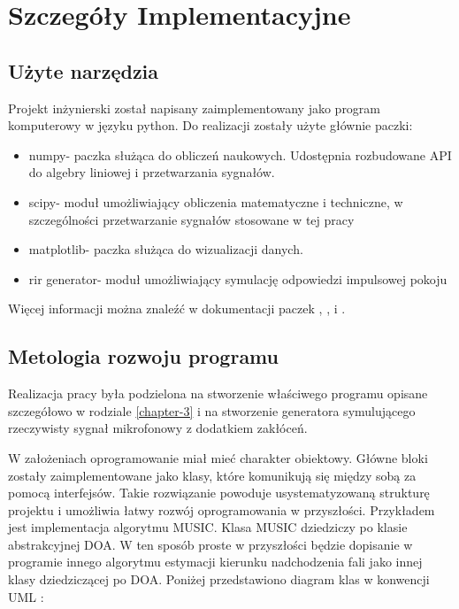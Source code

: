 \chapter{Szczegóły Implementacyjne}
\label{chapter-4}

\section{Użyte narzędzia}

\noindent Projekt inżynierski został napisany zaimplementowany jako program komputerowy w języku python. Do realizacji zostały użyte głównie paczki:

\begin{itemize}
    \item numpy- paczka służąca do obliczeń naukowych. Udostępnia rozbudowane API do algebry liniowej i przetwarzania sygnałów.
    \item scipy- moduł umożliwiający obliczenia matematyczne i techniczne, w szczególności przetwarzanie sygnałów stosowane w tej pracy
    \item matplotlib- paczka służąca do wizualizacji danych.
    \item rir generator- moduł umożliwiający symulację odpowiedzi impulsowej pokoju
\end{itemize}

\noindent Więcej informacji można znaleźć w dokumentacji paczek \cite{numpy}, \cite{matplotlib}, \cite{rir} i \cite{scipy}.

\section{Metologia rozwoju programu}

\noindent Realizacja pracy była podzielona na stworzenie właściwego programu opisane szczegółowo w rodziale \ref{chapter-3} i na stworzenie generatora symulującego rzeczywisty sygnał mikrofonowy z dodatkiem zakłóceń.


W założeniach oprogramowanie miał mieć charakter obiektowy. Główne bloki zostały zaimplementowane jako klasy, które komunikują się między sobą za pomocą interfejsów. Takie rozwiązanie powoduje usystematyzowaną strukturę projektu i umożliwia łatwy rozwój oprogramowania w przyszłości. Przykładem jest implementacja algorytmu MUSIC. Klasa MUSIC dziedziczy po klasie abstrakcyjnej DOA. W ten sposób proste w przyszłości będzie dopisanie w programie innego algorytmu estymacji kierunku nadchodzenia fali jako innej klasy dziedziczącej po DOA. Poniżej przedstawiono diagram klas w konwencji UML \cite{uml}:

